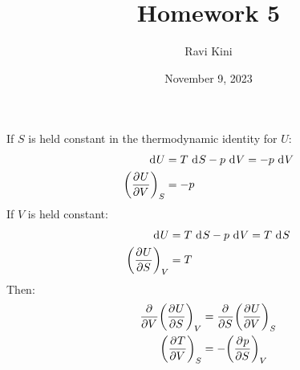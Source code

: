 \documentclass{article}
\title{Homework 5}
\author{Ravi Kini}
\date{November 9, 2023}
\begin{document}
\maketitle

If $S$ is held constant in the thermodynamic identity for $U$:
\begin{equation}
    \begin{split}
        \diff{U} & = T \, \diff{S} - p \, \diff{V} = -p \, \diff{V} \\
        {\left(\pderiv{U}{V}\right)}_S & = -p
    \end{split}
\end{equation}
If $V$ is held constant:
\begin{equation}
    \begin{split}
        \diff{U} & = T \, \diff{S} - p \, \diff{V} = T \, \diff{S} \\
        {\left(\pderiv{U}{S}\right)}_V & = T
    \end{split}
\end{equation}
Then:
\begin{equation}
    \begin{split}
        \frac{\partial^{}} {\partial V^{}}{\left(\frac{\partial^{}U} {\partial S^{}}\right)}_V & = \frac{\partial^{}} {\partial S^{}}{\left(\frac{\partial^{}U} {\partial V^{}}\right)}_S \\
        {\left(\frac{\partial^{}T} {\partial V^{}}\right)}_S & = -{\left(\frac{\partial^{}p} {\partial S^{}}\right)}_V
    \end{split}
\end{equation}

\clearpage
\end{document}
